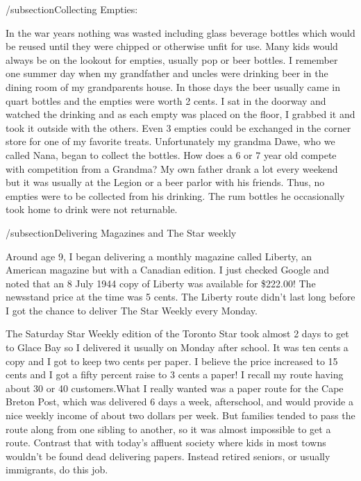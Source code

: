 /subsection{Collecting Empties}:

In the war years nothing was wasted including glass beverage bottles which would be reused until they were chipped or otherwise unfit for use. Many kids would always be on the lookout for empties, usually pop or beer bottles. I remember one summer day when my grandfather and uncles were drinking beer in the dining room of my grandparents house. In those days the beer usually came in quart bottles and the empties were worth 2 cents. I sat in the doorway and watched the drinking and as each empty was placed on the floor, I grabbed it and took it outside with the others. Even 3 empties could be exchanged in the corner store for one of my favorite treats. Unfortunately my grandma Dawe, who we called Nana, began to collect the bottles. How does a 6 or 7 year old compete with competition from a Grandma? My own father drank a lot every weekend but it was usually at the Legion or a beer parlor with his friends. Thus, no empties were to be collected from his drinking. The rum bottles he occasionally took home to drink were not returnable.

/subsection{Delivering Magazines and The Star weekly}

Around age 9, I began delivering a monthly magazine called Liberty, an American magazine but with a Canadian edition. I just checked Google and noted that an 8 July 1944 copy of Liberty was available for \$222.00! The newsstand price at the time was 5 cents. The Liberty route didn't last long before I got the chance to deliver The Star Weekly every Monday.

The Saturday Star Weekly edition of the Toronto Star took almost 2 days to get to Glace Bay so I delivered it usually on Monday after school. It was ten cents a copy and I got to keep two cents per paper. I believe the price increased to 15 cents and I got a fifty percent raise to 3 cents a paper! I recall my route having about 30 or 40 customers.What I really wanted was a paper route for the Cape Breton Post, which was delivered 6 days a week, afterschool, and would provide a nice weekly income of about two dollars per week. But families tended to pass the route along from one sibling to another, so it was almost impossible to get a route. Contrast that with today's affluent society where kids in most towns wouldn't be found dead delivering papers. Instead retired seniors, or usually immigrants, do this job.

